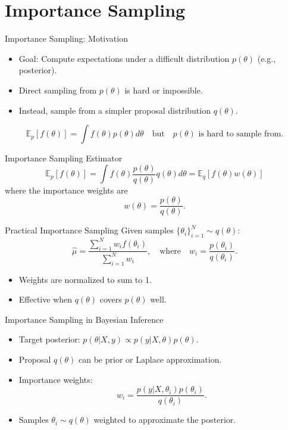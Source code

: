\documentclass{beamer}
\begin{document}
\section{Importance Sampling}
\begin{frame}{Importance Sampling: Motivation}
\begin{itemize}
    \item Goal: Compute expectations under a difficult distribution \( p(\theta) \) (e.g., posterior).
    \item Direct sampling from \( p(\theta) \) is hard or impossible.
    \item Instead, sample from a simpler proposal distribution \( q(\theta) \).
\end{itemize}
\[
\mathbb{E}_{p}[f(\theta)] = \int f(\theta) p(\theta) d\theta \quad \text{but} \quad p(\theta) \text{ is hard to sample from}.
\]
\end{frame}

\begin{frame}{Importance Sampling Estimator}
\[
\mathbb{E}_{p}[f(\theta)] = \int f(\theta) \frac{p(\theta)}{q(\theta)} q(\theta) d\theta = \mathbb{E}_{q}\left[f(\theta) w(\theta)\right]
\]
where the \alert{importance weights} are
\[
w(\theta) = \frac{p(\theta)}{q(\theta)}.
\]
\end{frame}

\begin{frame}{Practical Importance Sampling}
Given samples \(\{\theta_i\}_{i=1}^N \sim q(\theta)\):
\[
\hat{\mu} = \frac{\sum_{i=1}^N w_i f(\theta_i)}{\sum_{i=1}^N w_i}, \quad \text{where} \quad w_i = \frac{p(\theta_i)}{q(\theta_i)}.
\]
\begin{itemize}
    \item Weights are normalized to sum to 1.
    \item Effective when \( q(\theta) \) covers \( p(\theta) \) well.
\end{itemize}
\end{frame}

\begin{frame}{Importance Sampling in Bayesian Inference}
\begin{itemize}
    \item Target posterior: \( p(\theta | X, y) \propto p(y | X, \theta) p(\theta) \).
    \item Proposal \( q(\theta) \) can be prior or Laplace approximation.
    \item Importance weights:
\[
w_i = \frac{p(y | X, \theta_i) p(\theta_i)}{q(\theta_i)}.
\]
    \item Samples \(\theta_i \sim q(\theta)\) weighted to approximate the posterior.
\end{itemize}
\end{frame}
\end{document}
